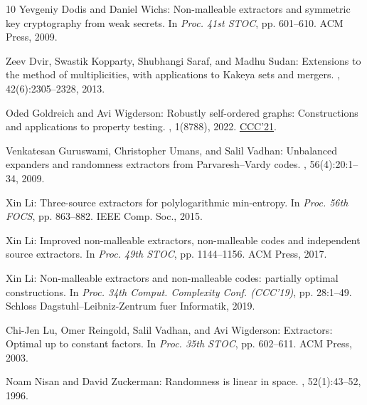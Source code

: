 \documentclass[11pt]{article}
\numberwithin{equation}{section}
\theoremstyle{definition}
\theoremstyle{plain}
\begin{document}
\begin{thebibliography}{10}
{\sc Yevgeniy Dodis and Daniel Wichs}: Non-malleable extractors and symmetric
  key cryptography from weak secrets.
\newblock In {\em Proc. 41st STOC}, pp. 601--610. ACM Press, 2009.
\newblock [\epfmtdoi{10.1145/1536414.1536496}]

{\sc Zeev Dvir, Swastik Kopparty, Shubhangi Saraf, and Madhu Sudan}: Extensions
  to the method of multiplicities, with applications to {K}akeya sets and
  mergers.
, 42(6):2305--2328, 2013.
\newblock [\epfmtdoi{10.1137/100783704}]

{\sc Oded Goldreich and Avi Wigderson}: Robustly self-ordered graphs:
  Constructions and applications to property testing.
, 1(8788), 2022.
\newblock \prelim \href{https://doi.org/10.4230/LIPIcs.CCC.2021.12}{CCC'21}.

{\sc Venkatesan Guruswami, Christopher Umans, and Salil Vadhan}: Unbalanced
  expanders and randomness extractors from {P}arvaresh--{V}ardy codes.
, 56(4):20:1--34, 2009.
\newblock [\epfmtdoi{10.1145/1538902.1538904}]

{\sc Xin Li}: Three-source extractors for polylogarithmic min-entropy.
\newblock In {\em Proc. 56th FOCS}, pp. 863--882. IEEE Comp. Soc., 2015.

{\sc Xin Li}: Improved non-malleable extractors, non-malleable codes and
  independent source extractors.
\newblock In {\em Proc. 49th STOC}, pp. 1144--1156. ACM Press, 2017.
\newblock [\epfmtdoi{10.1145/3055399.3055486}]

{\sc Xin Li}: Non-malleable extractors and non-malleable codes: partially
  optimal constructions.
\newblock In {\em Proc. 34th Comput. Complexity Conf. (CCC'19)}, pp. 28:1--49.
  Schloss Dagstuhl--Leibniz-Zentrum fuer Informatik, 2019.

{\sc Chi-Jen Lu, Omer Reingold, Salil Vadhan, and Avi Wigderson}: Extractors:
  Optimal up to constant factors.
\newblock In {\em Proc. 35th STOC}, pp. 602--611. ACM Press, 2003.
\newblock [\epfmtdoi{10.1145/780542.780630}]

{\sc Noam Nisan and David Zuckerman}: Randomness is linear in space.
, 52(1):43--52, 1996.


\end{thebibliography}
\end{document}
